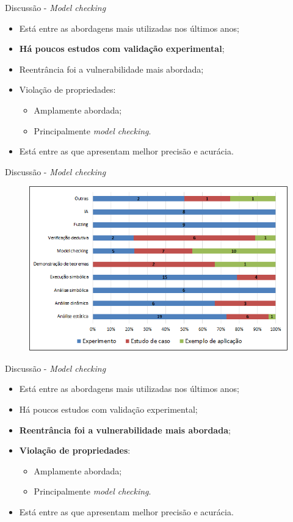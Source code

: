 \begin{frame}{Discussão - \textit{Model checking}}
	\begin{itemize}
		\item Está entre as abordagens mais utilizadas nos últimos anos;
		\item \textbf{Há poucos estudos com validação experimental};
		\item Reentrância foi a vulnerabilidade mais abordada;
		\item Violação de propriedades:
		\begin{itemize}
			\item Amplamente abordada;
			\item Principalmente \textit{model checking}.
		\end{itemize}
		\item Está entre as que apresentam melhor precisão e acurácia.
	\end{itemize}
\end{frame}

\begin{frame}{Discussão - \textit{Model checking}}
    \begin{figure}[!htb]
		\centering
		\includegraphics[scale=0.5]{figuras/metodologia/rq4-validacao-propostas.png}
	\end{figure} 
\end{frame}

\begin{frame}{Discussão - \textit{Model checking}}
	\begin{itemize}
		\item Está entre as abordagens mais utilizadas nos últimos anos;
		\item Há poucos estudos com validação experimental;
		\item \textbf{Reentrância foi a vulnerabilidade mais abordada};
		\item \textbf{Violação de propriedades}:
		\begin{itemize}
			\item Amplamente abordada;
			\item Principalmente \textit{model checking}.
		\end{itemize}
		\item Está entre as que apresentam melhor precisão e acurácia.
	\end{itemize}
\end{frame}

